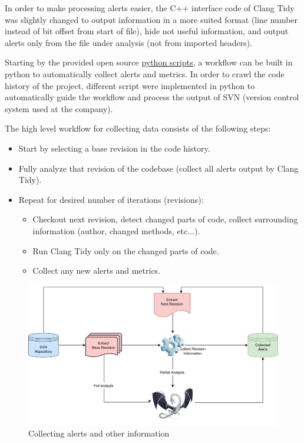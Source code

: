 In order to make processing alerts easier, the C++ interface code of Clang Tidy was slightly changed to output information in a more suited format (line number instead of bit offset from start of file), hide not useful information, and output alerts only from the file under analysis (not from imported headers).

Starting by the provided open source \href{https://github.com/llvm-mirror/clang-tools-extra/blob/master/clang-tidy/tool/run-clang-tidy.py}{python scripts}, a workflow can be built in python to automatically collect alerts and metrics. In order to crawl the code history of the project, different script were implemented in python to automatically guide the workflow and process the output of SVN (version control system used at the company).

The high level workflow for collecting data consists of the following steps:
\begin{itemize}
	\item Start by selecting a base revision in the code history.
	\item Fully analyze that revision of the codebase (collect all alerts output by Clang Tidy).
	\item Repeat for desired number of iterations (revisions):
	\begin{itemize}
		\item Checkout next revision, detect changed parts of code, collect surrounding information (author, changed methods, etc...).
		\item Run Clang Tidy only on the changed parts of code.
		\item Collect any new alerts and metrics.
	\end{itemize} 
\end{itemize}


\begin{figure}[H]
	\centering
	\includegraphics[scale=0.2]{./src/collect_info.png}
	\caption{Collecting alerts and other information}
\end{figure}

